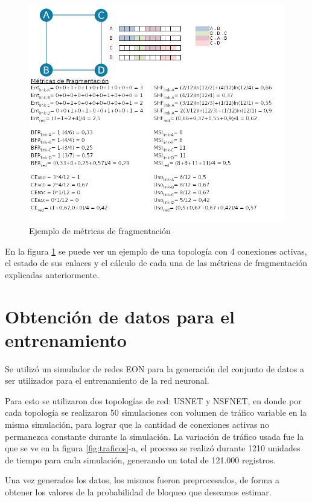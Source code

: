 \begin{figure}[!h]
    \centering
    \includegraphics[width=1\textwidth]{capitulos/img/ejemploMetricasCompleto4.png}
    \caption{Ejemplo de métricas de fragmentación}
    \label{fig:ejemploMetricas}
\end{figure}

En la figura \ref{fig:ejemploMetricas} se puede ver un ejemplo de una topología con 4 conexiones activas, el estado de sus enlaces y el cálculo de cada una de las métricas de fragmentación explicadas anteriormente. 

\section{Obtención de datos para el entrenamiento}
Se utilizó un simulador de redes EON \cite{davalos2019spectrum} para la generación del conjunto de datos a ser utilizados para el entrenamiento de la red neuronal.

Para esto se utilizaron dos topologías de red: USNET y NSFNET, en donde por cada topología se realizaron 50 simulaciones con volumen de  tráfico variable en la misma simulación, para lograr que la cantidad de conexiones activas no permanezca constante durante la simulación.  La variación de tráfico usada fue la que se ve en la figura \ref{fig:traficos}-a, el proceso se realizó durante 1210 unidades de tiempo para cada simulación, generando un total de 121.000 registros.

Una vez generados los datos, los mismos fueron preprocesados, de forma a obtener los valores de la probabilidad de bloqueo que deseamos estimar.

